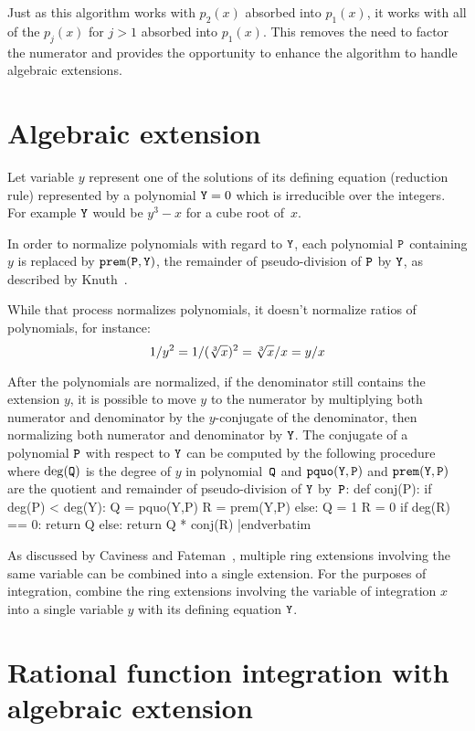 \medskip
Just as this algorithm works with $p_2(x)$ absorbed into $p_1(x)$, it
works with all of the $p_j(x)$ for $j>1$ absorbed into $p_1(x)$.  This
removes the need to factor the numerator and provides the opportunity
to enhance the algorithm to handle algebraic extensions.

\section{Algebraic extension}

Let variable $y$ represent one of the solutions of its defining
equation (reduction rule) represented by a polynomial ${\tt{Y}}=0$
which is irreducible over the integers.  For example ${\tt{Y}}$ would
be $y^3-x$ for a cube root of~$x$.

In order to normalize polynomials with regard to ${\tt{Y}}$, each
polynomial ${\tt{P}}$ containing $y$ is replaced by
${\tt{prem(P,Y)}}$, the remainder of pseudo-division of ${\tt{P}}$ by
${\tt{Y}}$, as described by Knuth~\cite{KnuthVol2}.

While that process normalizes polynomials, it doesn't normalize
ratios of polynomials, for instance:
$$1/y^2=1/(\root3\of{x})^2=\root3\of{x}/x=y/x$$

After the polynomials are normalized, if the denominator still
contains the extension $y$, it is possible to move $y$ to the
numerator by multiplying both numerator and denominator by the
$y$-conjugate of the denominator, then normalizing both numerator and
denominator by ${\tt{Y}}$.  The conjugate of a polynomial ${\tt{P}}$
with respect to ${\tt{Y}}$ can be computed by the following procedure
where $\deg({\tt{Q}})$ is the degree of $y$ in polynomial~${\tt{Q}}$ and
${\tt{pquo(Y,P)}}$ and ${\tt{prem(Y,P)}}$ are the quotient and
remainder of pseudo-division of ${\tt{Y}}$ by~${\tt{P}}$:
\medskip
\verbatim
def conj(P):
    if deg(P) < deg(Y):
        Q = pquo(Y,P)
        R = prem(Y,P)
    else:
        Q = 1
        R = 0
    if deg(R) == 0:
        return Q
    else:
        return Q * conj(R)
|endverbatim
\medskip

As discussed by Caviness and
Fateman~\cite{Caviness:1976:SRE:800205.806352}, multiple ring
extensions involving the same variable can be combined into a single
extension.  For the purposes of integration, combine the ring
extensions involving the variable of integration $x$ into a single
variable $y$ with its defining equation ${\tt{Y}}$.

\section{Rational function integration with algebraic extension}

